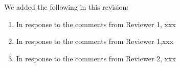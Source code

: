 \startReviewerTitle

We added the following in this revision:

\begin{enumerate}
    \item In response to the comments from Reviewer 1, xxx
    \item In response to the comments from Reviewer 1,xxx
    \item In response to the comments from Reviewer 2, xxx
\end{enumerate}